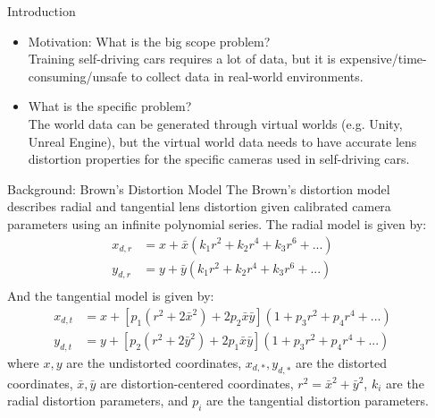\documentclass[final]{beamer}
\newlength{\sepwidth}
\newlength{\colwidth}
\newcommand{\separatorcolumn}{\begin{column}{\sepwidth}\end{column}}
\begin{document}
\begin{frame}[t]
\begin{columns}[t]
\separatorcolumn

\begin{column}{\colwidth}

  \begin{block}{Introduction}

    \begin{itemize}
      \item Motivation: What is the big scope problem?\\
      Training self-driving cars requires a lot of data, but it is expensive/time-consuming/unsafe to collect data in real-world environments.\\
      \item What is the specific problem?\\
      The world data can be generated through virtual worlds (e.g. Unity, Unreal Engine), but the virtual world data needs to have accurate lens distortion properties for the specific cameras used in self-driving cars.
    \end{itemize}

  \end{block}

  \begin{block}{Background: Brown's Distortion Model}
    The Brown's distortion model describes radial and tangential lens distortion given calibrated camera parameters using an infinite polynomial series. The radial model is given by:
    \begin{align*}
      x_{d,r}&= x + \bar{x} \left( k_1 r^2 + k_2 r^4 + k_3 r^6 + ... \right) \\
      y_{d,r}&= y + \bar{y} \left( k_1 r^2 + k_2 r^4 + k_3 r^6 + ... \right) \\
    \end{align*}
    And the tangential model is given by:
    \begin{align*}
      x_{d,t}&= x + \left[p_1 (r^2 + 2 \bar{x}^2) + 2 p_2 \bar{x} \bar{y}\right] \left(1 + p_3 r^2 + p_4 r^4 + ...\right)\\
      y_{d,t}&= y + \left[p_2 (r^2 + 2 \bar{y}^2) + 2 p_1 \bar{x} \bar{y}\right]\left(1 + p_3 r^2 + p_4 r^4 + ...\right)
    \end{align*}
    where $x, y$ are the undistorted coordinates, $x_{d,*}, y_{d,*}$ are the distorted coordinates, $\bar{x}, \bar{y}$ are distortion-centered coordinates, $r^2 = \bar{x}^2 + \bar{y}^2$, $k_i$ are the radial distortion parameters, and $p_i$ are the tangential distortion parameters.
  \end{block}


\end{column}
\end{columns}
\end{frame}
\end{document}
